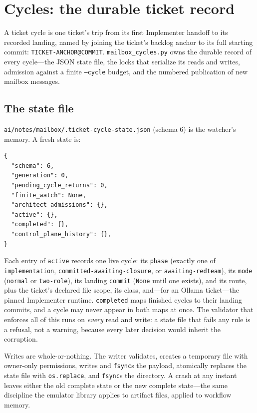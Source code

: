 \documentclass[10pt,aps,prd,twocolumn,nofootinbib]{revtex4-2}
\newcommand{\code}[1]{\texttt{#1}}
\newcommand{\file}[1]{\texttt{#1}}
\begin{document}
\section{Cycles: the durable ticket record}
\label{sec:cycles}

A ticket cycle is one ticket's trip from its first Implementer handoff
to its recorded landing, named by joining the ticket's backlog anchor
to its full starting commit: \code{TICKET-ANCHOR@COMMIT}.
\file{mailbox\_cycles.py} owns the durable record of every cycle---the
JSON state file, the locks that serialize its reads and writes,
admission against a finite \code{--cycle} budget, and the numbered
publication of new mailbox messages.

\subsection{The state file}

\file{ai/notes/mailbox/.ticket-cycle-state.json} (schema 6) is the
watcher's memory.  A fresh state is:

\begin{verbatim}
{
  "schema": 6,
  "generation": 0,
  "pending_cycle_returns": 0,
  "finite_watch": None,
  "architect_admissions": {},
  "active": {},
  "completed": {},
  "control_plane_history": {},
}
\end{verbatim}

Each entry of \code{active} records one live cycle: its \code{phase}
(exactly one of \code{implementation},
\code{committed-awaiting-closure}, or \code{awaiting-redteam}), its
\code{mode} (\code{normal} or \code{two-role}), its landing
\code{commit} (\code{None} until one exists), and its route, plus the
ticket's declared file scope, its class, and---for an Ollama
ticket---the pinned Implementer runtime.  \code{completed} maps
finished cycles to their landing commits, and a cycle may never appear
in both maps at once.  The validator that enforces all of this runs on
\emph{every} read and write: a state file that fails any rule is a
refusal, not a warning, because every later decision would inherit the
corruption.

Writes are whole-or-nothing.  The writer validates, creates a
temporary file with owner-only permissions, writes and \code{fsync}s
the payload, atomically replaces the state file with
\code{os.replace}, and \code{fsync}s the directory.  A crash at any
instant leaves either the old complete state or the new complete
state---the same discipline the emulator library applies to artifact
files, applied to workflow memory.
\end{document}
